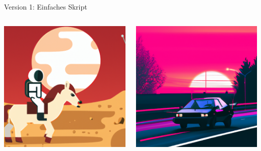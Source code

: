 {\begin{frame}{Version 1: Einfaches Skript}
\begin{columns}
        \includegraphics[width=\textwidth]{img/ipaint-generiert2}

        \includegraphics[width=\textwidth]{img/ipaint-generiert3}


\end{columns}
\end{frame}}
